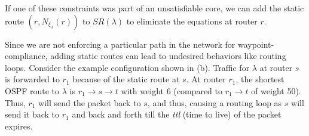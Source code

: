 If one of these constraints was part of an unsatisfiable  
core, we can add the static route $(r, N_{\xi_\lambda}(r))$ to
$SR(\lambda)$ to eliminate the equations at router $r$. 


			
 \label{sec:loopavoidance}
Since we are not enforcing a particular path in the network for waypoint-
compliance, adding
static routes can lead to undesired behaviors like routing loops.  
Consider the example configuration shown in (b). 
Traffic for $\lambda$ at router $s$ is forwarded to $r_1$ because of the
static route at $s$. At router $r_1$, the shortest OSPF route to
$\lambda$ is $r_1 \rightarrow s \rightarrow t$ with weight 6 (compared 
to $r_1 \rightarrow t$ of weight 50). Thus, $r_1$ will send the 
packet back to $s$, and thus, causing a routing loop as $s$ will send
it back to $r_1$ and back and forth till the \emph{ttl} (time to live) of the
packet expires. 


